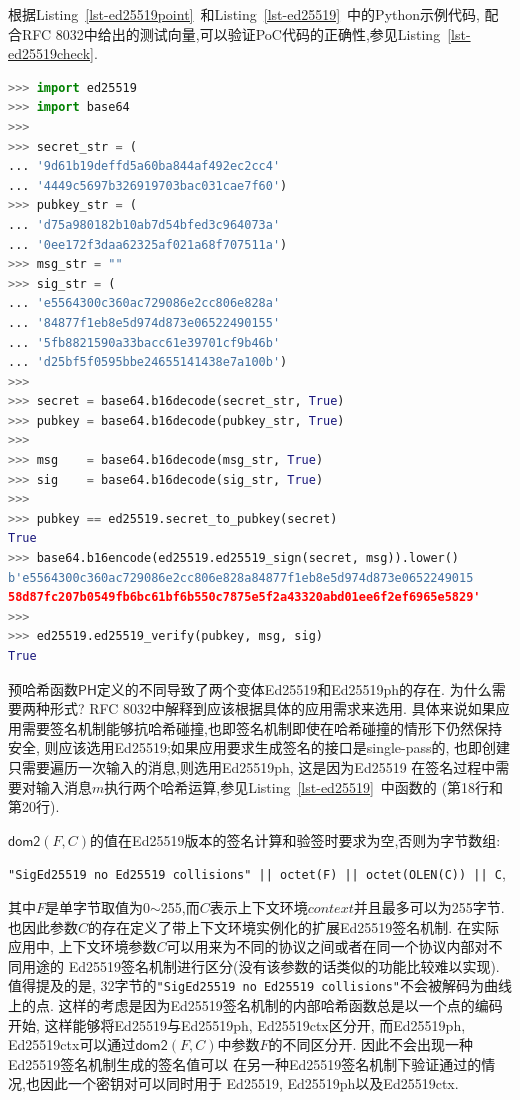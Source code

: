 

根据Listing~\ref{lst-ed25519point}~和Listing~\ref{lst-ed25519}~中的Python示例代码,
配合RFC 8032中给出的测试向量,可以验证PoC代码的正确性,参见Listing~\ref{lst-ed25519check}.

\begin{lstlisting}[language=python, caption=验证Ed25519实现正确性, label=lst-ed25519check]
>>> import ed25519
>>> import base64
>>>
>>> secret_str = (
... '9d61b19deffd5a60ba844af492ec2cc4'
... '4449c5697b326919703bac031cae7f60')
>>> pubkey_str = (
... 'd75a980182b10ab7d54bfed3c964073a'
... '0ee172f3daa62325af021a68f707511a')
>>> msg_str = ""
>>> sig_str = (
... 'e5564300c360ac729086e2cc806e828a'
... '84877f1eb8e5d974d873e06522490155'
... '5fb8821590a33bacc61e39701cf9b46b'
... 'd25bf5f0595bbe24655141438e7a100b')
>>>
>>> secret = base64.b16decode(secret_str, True)
>>> pubkey = base64.b16decode(pubkey_str, True)
>>>
>>> msg    = base64.b16decode(msg_str, True)
>>> sig    = base64.b16decode(sig_str, True)
>>> 
>>> pubkey == ed25519.secret_to_pubkey(secret)
True
>>> base64.b16encode(ed25519.ed25519_sign(secret, msg)).lower()
b'e5564300c360ac729086e2cc806e828a84877f1eb8e5d974d873e0652249015
58d87fc207b0549fb6bc61bf6b550c7875e5f2a43320abd01ee6f2ef6965e5829'
>>>
>>> ed25519.ed25519_verify(pubkey, msg, sig)
True
\end{lstlisting}

预哈希函数$\textsf{PH}$定义的不同导致了两个变体\textsf{Ed25519}和\textsf{Ed25519ph}的存在.
为什么需要两种形式? RFC 8032中解释到应该根据具体的应用需求来选用.
具体来说如果应用需要签名机制能够抗哈希碰撞,也即签名机制即使在哈希碰撞的情形下仍然保持安全,
则应该选用\textsf{Ed25519};如果应用要求生成签名的接口是single-pass的,
也即创建只需要遍历一次输入的消息,则选用\textsf{Ed25519ph}, 这是因为\textsf{Ed25519}
在签名过程中需要对输入消息$m$执行两个哈希运算,参见Listing~\ref{lst-ed25519}~中函数的
 (第18行和第20行).

$\textsf{dom2}(F,C)$的值在\textsf{Ed25519}版本的签名计算和验签时要求为空,否则为字节数组: \\
\centerline{\texttt{"SigEd25519 no Ed25519 collisions" || octet(F) || octet(OLEN(C)) || C},}
其中$F$是单字节取值为0$\sim$255,而$C$表示上下文环境$context$并且最多可以为255字节.
也因此参数$C$的存在定义了带上下文环境实例化的扩展Ed25519签名机制.
在实际应用中, 上下文环境参数$C$可以用来为不同的协议之间或者在同一个协议内部对不同用途的
Ed25519签名机制进行区分(没有该参数的话类似的功能比较难以实现).
值得提及的是, 32字节的\texttt{"SigEd25519 no Ed25519 collisions"}不会被解码为曲线上的点.
这样的考虑是因为Ed25519签名机制的内部哈希函数总是以一个点的编码开始,
这样能够将\textsf{Ed25519}与\textsf{Ed25519ph}, \textsf{Ed25519ctx}区分开, 
而\textsf{Ed25519ph}, \textsf{Ed25519ctx}可以通过$\textsf{dom2}(F,C)$中参数$F$的不同区分开.
因此不会出现一种Ed25519签名机制生成的签名值可以
在另一种Ed25519签名机制下验证通过的情况,也因此一个密钥对可以同时用于
\textsf{Ed25519}, \textsf{Ed25519ph}以及\textsf{Ed25519ctx}.

